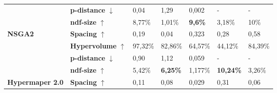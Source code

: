 \begin{table}[]
\begin{tabular}{@{}lllllll@{}}
                                                                                              & \textbf{p-distance} $\downarrow$  & 0,04                                     & 1,29                                     & 0,002                                     & -                                        & -                                        \\
                                                                                              & \textbf{ndf-size} $\uparrow$     & 8,77\%                                   & 1,01\%                                   & \cellcolor[HTML]{EFEFEF}\textbf{9,6\%}    & 3,18\%                                   & 10\%                                     \\
    \multirow{-4}{*}{\textbf{NSGA2}}                                                          & \textbf{Spacing} $\uparrow$      & 0,19                                     & 0,04                                     & 0,323                                     & 0,28                                     & 0,58                                     \\ \midrule
                                                                                              & \textbf{Hypervolume} $\uparrow$  & 97,32\%                                  & 82,86\%                                  & 64,57\%                                   & 44,12\%                                  & 84,39\%                                  \\ 
                                                                                              & \textbf{p-distance} $\downarrow$  & 0,90                                     & 1,12                                     & 0,059                                     & -                                        & -                                        \\
                                                                                              & \textbf{ndf-size} $\uparrow$     & 5,42\%                                   & \cellcolor[HTML]{EFEFEF}\textbf{6,25\%}  & 1,177\%                                   & \cellcolor[HTML]{EFEFEF}\textbf{10,24\%} & 3,26\%                                   \\
    \multirow{-4}{*}{\textbf{Hypermaper 2.0}}                                                     & \textbf{Spacing} $\uparrow$      & 0,11                                     & 0,08                                     & 0,029                                     & 0,31                                     & 0,06                                     \\ \midrule

\end{tabular}
\end{table}

